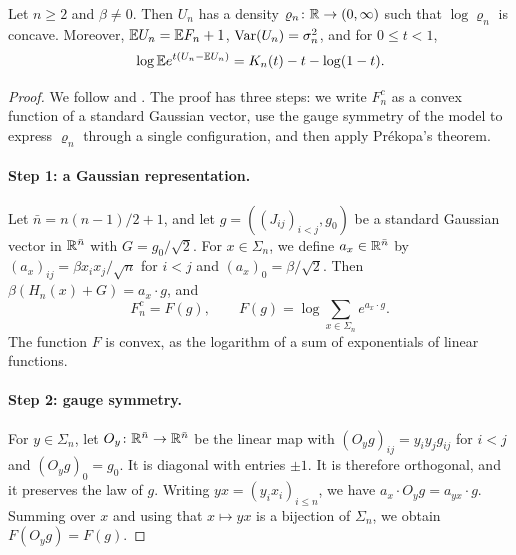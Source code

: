 \begin{lemma}\label{f:logconcave}
Let $n\ge2$ and $\beta\ne0$. Then $U_n$ has a density $\varrho_n\colon\mathbb R\to(0,\infty)$ such that $\log \varrho_n$ is concave. Moreover, $\mathbb E U_n=\mathbb E F_n+1$, $\operatorname{Var}(U_n)=\sigma_n^2$, and for $0\le t<1$,
\begin{equation}\label{f:smooth-transform}
 \log\mathbb E e^{t(U_n-\mathbb E U_n)}=K_n(t)-t-\log(1-t).
\end{equation}
\end{lemma}

\begin{proof}
We follow \cite[Proposition~5.1, proof]{quantitative-parisi} and \cite[Lemma~7.6]{oai-fluctuations}. The proof has three steps: we write $F_n^c$ as a convex function of a standard Gaussian vector, use the gauge symmetry of the model to express $\varrho_n$ through a single configuration, and then apply Pr\'ekopa's theorem.

\paragraph{Step 1: a Gaussian representation.} Let $\bar n=n(n-1)/2+1$, and let $g=((J_{ij})_{i<j},g_0)$ be a standard Gaussian vector in $\mathbb R^{\bar n}$ with $G=g_0/\sqrt2$. For $x\in\Sigma_n$, we define $a_x\in\mathbb R^{\bar n}$ by $(a_x)_{ij}=\beta x_ix_j/\sqrt n$ for $i<j$ and $(a_x)_0=\beta/\sqrt2$. Then $\beta(H_n(x)+G)=a_x\cdot g$, and
\[
 F_n^c=F(g),\qquad F(g)=\log\sum_{x\in\Sigma_n}e^{a_x\cdot g}.
\]
The function $F$ is convex, as the logarithm of a sum of exponentials of linear functions.

\paragraph{Step 2: gauge symmetry.} For $y\in\Sigma_n$, let $O_y\colon\mathbb R^{\bar n}\to\mathbb R^{\bar n}$ be the linear map with $(O_yg)_{ij}=y_iy_jg_{ij}$ for $i<j$ and $(O_yg)_0=g_0$. It is diagonal with entries $\pm1$. It is therefore orthogonal, and it preserves the law of $g$. Writing $yx=(y_ix_i)_{i\le n}$, we have $a_x\cdot O_yg=a_{yx}\cdot g$. Summing over $x$ and using that $x\mapsto yx$ is a bijection of $\Sigma_n$, we obtain $F(O_yg)=F(g)$.


\end{proof}
